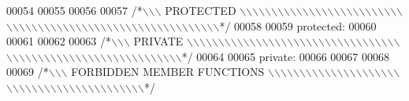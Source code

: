 \begin{DoxyCode}
00054 
00055 
00056 
00057 \textcolor{comment}{/*\(\backslash\)\(\backslash\)\(\backslash\) PROTECTED \(\backslash\)\(\backslash\)\(\backslash\)\(\backslash\)\(\backslash\)\(\backslash\)\(\backslash\)\(\backslash\)\(\backslash\)\(\backslash\)\(\backslash\)\(\backslash\)\(\backslash\)\(\backslash\)\(\backslash\)\(\backslash\)\(\backslash\)\(\backslash\)\(\backslash\)\(\backslash\)\(\backslash\)\(\backslash\)\(\backslash\)\(\backslash\)\(\backslash\)\(\backslash\)\(\backslash\)\(\backslash\)\(\backslash\)\(\backslash\)\(\backslash\)\(\backslash\)\(\backslash\)\(\backslash\)\(\backslash\)\(\backslash\)\(\backslash\)\(\backslash\)\(\backslash\)\(\backslash\)\(\backslash\)\(\backslash\)\(\backslash\)\(\backslash\)\(\backslash\)\(\backslash\)\(\backslash\)\(\backslash\)\(\backslash\)\(\backslash\)\(\backslash\)\(\backslash\)\(\backslash\)\(\backslash\)\(\backslash\)\(\backslash\)\(\backslash\)\(\backslash\)\(\backslash\)\(\backslash\)*/}
00058 
00059 \textcolor{keyword}{protected}:
00060 
00061 
00062 
00063 \textcolor{comment}{/*\(\backslash\)\(\backslash\)\(\backslash\) PRIVATE \(\backslash\)\(\backslash\)\(\backslash\)\(\backslash\)\(\backslash\)\(\backslash\)\(\backslash\)\(\backslash\)\(\backslash\)\(\backslash\)\(\backslash\)\(\backslash\)\(\backslash\)\(\backslash\)\(\backslash\)\(\backslash\)\(\backslash\)\(\backslash\)\(\backslash\)\(\backslash\)\(\backslash\)\(\backslash\)\(\backslash\)\(\backslash\)\(\backslash\)\(\backslash\)\(\backslash\)\(\backslash\)\(\backslash\)\(\backslash\)\(\backslash\)\(\backslash\)\(\backslash\)\(\backslash\)\(\backslash\)\(\backslash\)\(\backslash\)\(\backslash\)\(\backslash\)\(\backslash\)\(\backslash\)\(\backslash\)\(\backslash\)\(\backslash\)\(\backslash\)\(\backslash\)\(\backslash\)\(\backslash\)\(\backslash\)\(\backslash\)\(\backslash\)\(\backslash\)\(\backslash\)\(\backslash\)\(\backslash\)\(\backslash\)\(\backslash\)\(\backslash\)\(\backslash\)\(\backslash\)\(\backslash\)\(\backslash\)*/}
00064 
00065 \textcolor{keyword}{private}:
00066 
00067 
00068 
00069 \textcolor{comment}{/*\(\backslash\)\(\backslash\)\(\backslash\) FORBIDDEN MEMBER FUNCTIONS \(\backslash\)\(\backslash\)\(\backslash\)\(\backslash\)\(\backslash\)\(\backslash\)\(\backslash\)\(\backslash\)\(\backslash\)\(\backslash\)\(\backslash\)\(\backslash\)\(\backslash\)\(\backslash\)\(\backslash\)\(\backslash\)\(\backslash\)\(\backslash\)\(\backslash\)\(\backslash\)\(\backslash\)\(\backslash\)\(\backslash\)\(\backslash\)\(\backslash\)\(\backslash\)\(\backslash\)\(\backslash\)\(\backslash\)\(\backslash\)\(\backslash\)\(\backslash\)\(\backslash\)\(\backslash\)\(\backslash\)\(\backslash\)\(\backslash\)\(\backslash\)\(\backslash\)\(\backslash\)\(\backslash\)\(\backslash\)\(\backslash\)*/}

\end{DoxyCode}

